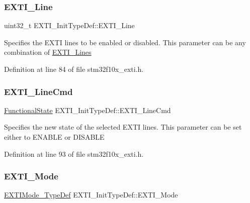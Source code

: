 \subsubsection{\texorpdfstring{E\+X\+T\+I\+\_\+\+Line}{EXTI\_Line}}
{\footnotesize\ttfamily uint32\+\_\+t E\+X\+T\+I\+\_\+\+Init\+Type\+Def\+::\+E\+X\+T\+I\+\_\+\+Line}

Specifies the E\+X\+TI lines to be enabled or disabled. This parameter can be any combination of \hyperlink{group___e_x_t_i___lines}{E\+X\+T\+I\+\_\+\+Lines} 

Definition at line 84 of file stm32f10x\+\_\+exti.\+h.

\mbox{\label{struct_e_x_t_i___init_type_def_ac1769bc5badaef4cffbcf105e3fe1c27}} 
\subsubsection{\texorpdfstring{E\+X\+T\+I\+\_\+\+Line\+Cmd}{EXTI\_LineCmd}}
{\footnotesize\ttfamily \hyperlink{group___exported__types_gac9a7e9a35d2513ec15c3b537aaa4fba1}{Functional\+State} E\+X\+T\+I\+\_\+\+Init\+Type\+Def\+::\+E\+X\+T\+I\+\_\+\+Line\+Cmd}

Specifies the new state of the selected E\+X\+TI lines. This parameter can be set either to E\+N\+A\+B\+LE or D\+I\+S\+A\+B\+LE 

Definition at line 93 of file stm32f10x\+\_\+exti.\+h.

\mbox{\label{struct_e_x_t_i___init_type_def_a741816862b9cd43cc80781dc89150e7e}} 
\subsubsection{\texorpdfstring{E\+X\+T\+I\+\_\+\+Mode}{EXTI\_Mode}}
{\footnotesize\ttfamily \hyperlink{group___e_x_t_i___exported___types_gad5e69af98dc0dfdf64417adc1cf57929}{E\+X\+T\+I\+Mode\+\_\+\+Type\+Def} E\+X\+T\+I\+\_\+\+Init\+Type\+Def\+::\+E\+X\+T\+I\+\_\+\+Mode}

